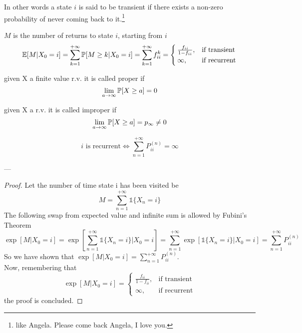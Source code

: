 	In other words a state $i$ is said to be transient if there exists a non-zero probability of never coming back to it.\footnote{like Angela. Please come back Angela, I love you.}

	\begin{definition}
		$M$ is the number of returns to state $i$, starting from $i$
		$$\mathbb{E}[M | X_0 = i] = \sum\limits_{k=1}^{+\infty} \mathbb{P}[M\geq k | X_0 = i] = \sum\limits_{k=1}^{+\infty} f_{ii}^k = \begin{cases}
		\frac{f_{ii}}{1-f_{ii}}, & \text{if transient} \\
		\infty, & \text{if recurrent}
		\end{cases}$$
	\end{definition}

	\begin{definition}[Proper r.v]
		given X a finite value r.v. it is called proper if $$\lim_{a\to \infty} \mathbb{P}[X\geq a] = 0$$
	\end{definition}

	\begin{definition}[Improper r.v]
		given X a r.v. it is called improper if  $$\lim_{a\to \infty} \mathbb{P}[X\geq a] = p_\infty \ne 0$$
	\end{definition}

	\begin{theorem}
		$$i  \text{ is recurrent} \iff \sum\limits_{n=1}^{+\infty} P_{ii}^{(n)} = \infty$$
	\end{theorem}
	---

	\begin{proof}
		Let the number of time state i has been visited be $$M = \sum\limits_{n=1}^{+\infty} \mathds{1}\{X_n =i\} $$
		The following swap from expected value and infinite sum is allowed by Fubini's Theorem
		$$
			\exp[M | X_0 = i] = \exp\left[\sum\limits_{n=1}^{+\infty} \mathds{1}\{X_n = i\} | X_0 = i\right]
			= \sum\limits_{n=1}^{+\infty} \exp\left[\mathds{1}\{ X_n = i\} | X_0 = i\right] = \sum\limits_{n=1}^{+\infty} P_{ii}^{(n)}
		$$
		So we have shown that $\exp[M | X_0=i] = \sum\limits_{n=1}^{+\infty} P_{ii}^{(n)}$.\\
		Now, remembering that $$ \exp[M | X_0 = i] = \begin{cases}
		\frac{f_{ii}}{1-f_{ii}}, & \text{if transient} \\
		\infty, & \text{if recurrent}
		\end{cases}$$
		the proof is concluded.
	\end{proof}

